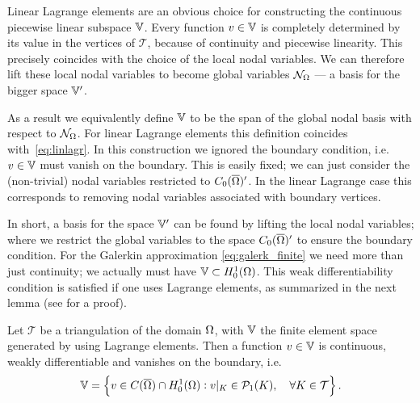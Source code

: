 \documentclass[thesis.tex]{subfiles}
\begin{document}
  Linear Lagrange elements are an obvious choice for constructing the continuous piecewise linear subspace $\mathbb{V}$.
  Every function $v \in \mathbb{V}$ is completely
  determined by its value in the vertices of $\mathcal{T}$, because of continuity and piecewise linearity.
  This precisely coincides with the choice of the local nodal variables. We can therefore lift these local nodal variables to become
  global variables  $\mathcal{N}_\Omega$ --- a basis for the bigger space $\mathbb{V}'$. 
  
  As a result we equivalently define $\mathbb{V}$ to be the span of the global nodal basis with respect to $\mathcal{N}_\Omega$.   
  For linear Lagrange elements this definition coincides with~\eqref{eq:linlagr}.
  In this construction  we ignored the boundary condition, i.e.  $v \in \mathbb{V}$ must vanish on the boundary.
   This is easily fixed; we can just consider the (non-trivial)
   nodal variables restricted to $C_0(\overline{\Omega})'$. In the linear Lagrange case this corresponds to removing nodal variables associated with
   boundary vertices.  

  In short, a basis for the space $\mathbb{V}'$ can be found by lifting the local nodal variables; where we restrict
  the global variables to the space $C_0(\overline{\Omega})'$ to ensure the boundary condition.
  For the Galerkin approximation \eqref{eq:galerk_finite} we need more than just continuity; we actually must have $\mathbb{V} \subset H^1_0(\Omega)$. This
  weak differentiability  condition is satisfied if one uses Lagrange elements, as summarized in the next lemma (see \cite{brenner} for a proof).
  \begin{lem}
    \label{lem:lin_lagrange}
    Let $\mathcal{T}$ be a triangulation of the domain $\Omega$, with $\mathbb{V}$ the finite element space generated
    by using Lagrange elements. Then a function $v \in \mathbb{V}$ is continuous, weakly differentiable and vanishes on the boundary, i.e.
    \[
      \mathbb{V} = \set{v \in C(\overline{\Omega}) \cap H_0^1(\Omega) : v|_{K} \in \mathcal{P}_1(K), \quad \forall K \in \mathcal{T}}.
    \]
  \end{lem}
\end{document}
